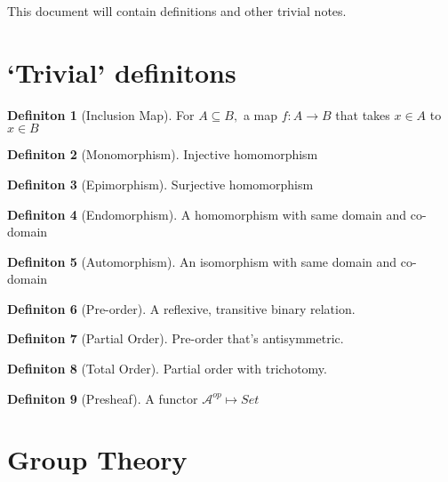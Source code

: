 \documentclass{article}
\theoremstyle{definition}
\theoremstyle{definition}
\newtheorem{definition}{Definiton}[section]
\begin{document}
This document will contain definitions and other trivial notes.
\section{`Trivial' definitons}

\begin{definition}[Inclusion Map] %
	For $ A \subseteq B, $ a map $ f:A \rightarrow B $ that takes $ x\in A $ to $ x \in B $
\end{definition}

\begin{definition}[Monomorphism] %
Injective homomorphism
\end{definition}

\begin{definition}[Epimorphism] %
Surjective homomorphism
\end{definition}

\begin{definition}[Endomorphism] %
A homomorphism with same domain and co-domain
\end{definition}

\begin{definition}[Automorphism] %
An isomorphism with same domain and co-domain
\end{definition}

\begin{definition}[Pre-order] %
	A reflexive, transitive binary relation.
\end{definition}

\begin{definition}[Partial Order] %
Pre-order that's antisymmetric.
\end{definition}

\begin{definition}[Total Order] %
Partial order with trichotomy.
\end{definition}

\begin{definition}[Presheaf] %
	A functor $ \mathcal{A} ^{op} \mapsto Set$
\end{definition}

\section{Group Theory}
\end{document}
